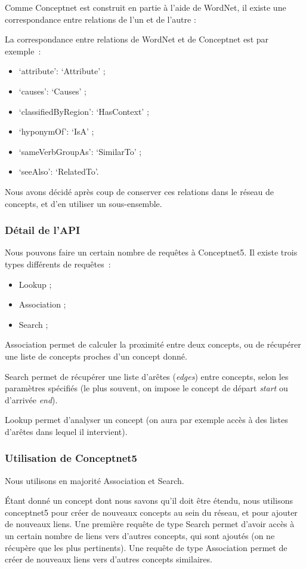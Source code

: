 \documentclass[a4paper,12pt]{article}
\newcommand{\ang}[1]{\textit{#1}}%
\begin{document}
Comme Conceptnet est construit en partie \`a l'aide de WordNet, il existe une correspondance entre relations de l'un et de l'autre :

La correspondance entre relations de WordNet et de Conceptnet est par exemple~:
\begin{itemize}
 \item `attribute': `Attribute' ;
 \item `causes': `Causes' ;
 \item `classifiedByRegion': `HasContext' ;
 \item `hyponymOf': `IsA' ;
 \item `sameVerbGroupAs': `SimilarTo' ;
 \item `seeAlso': `RelatedTo'.
\end{itemize}

Nous avons décidé après coup de conserver ces relations dans le réseau de concepts, et d'en utiliser un sous-ensemble.

\subsubsection{Détail de l'API}

Nous pouvons faire un certain nombre de requêtes à Conceptnet5. Il existe trois types différents de requêtes~:
\begin{itemize}
 \item Lookup ;
 \item Association ;
 \item Search ;
\end{itemize}
Association permet de calculer la proximité entre deux concepts, ou de récupérer une liste de concepts proches d'un concept donné.

Search permet de récupérer une liste d'arêtes (\ang{edges}) entre concepts, selon les paramètres spécifiés (le plus souvent, on impose le concept de départ \ang{start} ou d'arrivée \ang{end}). 

Lookup permet d'analyser un concept (on aura par exemple accès à des listes d'arêtes dans lequel il intervient).


\subsubsection{Utilisation de Conceptnet5}

Nous utilisons en majorité Association et Search.

Étant donné un concept dont nous savons qu'il doit être étendu, nous utilisons conceptnet5 pour créer de nouveaux concepts au sein du réseau, et pour ajouter de nouveaux liens. Une première requête de type Search permet d'avoir accès à un certain nombre de liens vers d'autres concepts, qui sont ajoutés (on ne récupère que les plus pertinents). Une requête de type Association permet de créer de nouveaux liens vers d'autres concepts similaires.
\end{document}
